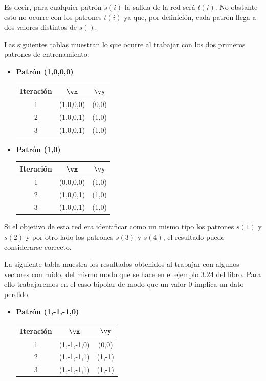 \begin{problem}[11]
Es decir, para cualquier patrón $s(i)$ la salida de la red será $t(i)$. No obstante esto no ocurre con los patrones $t(i)$ ya que, por definición, cada patrón llega a dos valores distintos de $s()$.

Las siguientes tablas muestran lo que ocurre al trabajar con los dos primeros patrones de entrenamiento:

\begin{multicols}{2}
\begin{itemize}
\item \textbf{Patrón (1,0,0,0)}

\begin{tabular}{|ccc|}
\hline
\textbf{Iteración} & $\vx$ & $\vy$ \\
\hline
1 & (1,0,0,0) & (0,0) \\
\hline
2 & (1,0,0,1) & (1,0) \\
\hline
3 & (1,0,0,1) & (1,0) \\
\hline
\end{tabular}
\item \textbf{Patrón (1,0)}

\begin{tabular}{|ccc|}
\hline
\textbf{Iteración} & $\vx$ & $\vy$ \\
\hline
1 & (0,0,0,0) & (1,0) \\
\hline
2 & (1,0,0,1) & (1,0) \\
\hline
3 & (1,0,0,1) & (1,0) \\
\hline
\end{tabular}
\end{itemize}
\end{multicols}

Si el objetivo de esta red era identificar como un mismo tipo los patrones $s(1)$ y $s(2)$ y por otro lado los patrones $s(3)$ y $s(4)$, el resultado puede considerarse correcto.

\spart

La siguiente tabla muestra los resultados obtenidos al trabajar con algunos vectores con ruido, del mismo modo que se hace en el ejemplo 3.24 del libro. Para ello trabajaremos en el caso bipolar de modo que un valor 0 implica un dato perdido

\begin{multicols}{2}
\begin{itemize}
\item \textbf{Patrón (1,-1,-1,0)}

\begin{tabular}{|ccc|}
\hline
\textbf{Iteración} & $\vx$ & $\vy$ \\
\hline
1 & (1,-1,-1,0) & (0,0) \\
\hline
2 & (1,-1,-1,1) & (1,-1) \\
\hline
3 & (1,-1,-1,1) & (1,-1) \\
\hline
\end{tabular}


\end{itemize}
\end{multicols}
\end{problem}
